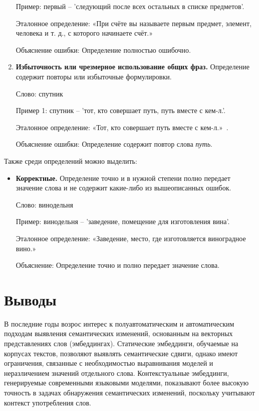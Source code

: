 \documentclass[LI,VKR]{HSEUniversity}
\begin{document}
\begin{enumerate}
   Пример: первый – ’следующий после всех остальных в списке предметов’.

   Эталонное определение: «При счёте вы называете первым предмет, элемент, человека и т. д., с которого начинаете счёт.»~\cite{TolkovyDmitriev}

   Объяснение ошибки: Определение полностью ошибочно.

%
%
%

\item \textbf{Избыточность или чрезмерное использование общих фраз.} Определение содержит повторы или избыточные формулировки.

%
%
%

   Слово: спутник

   Пример 1: спутник – ’тот, кто совершает путь, путь вместе с кем-л.’.

   Эталонное определение: «Тот, кто совершает путь вместе с кем-л.»~\cite{TolkovyKuznetsov}.

   Объяснение ошибки: Определение содержит повтор слова \textit{путь}.

\end{enumerate}

Также среди определений можно выделить:
\begin{itemize}
\item \textbf{Корректные.} Определение точно и в нужной степени полно передает значение слова и не содержит какие-либо из вышеописанных ошибок.

   Слово: винодельня

   Пример: винодельня – ’заведение, помещение для изготовления вина’.

   Эталонное определение: «Заведение, место, где изготовляется виноградное вино.»~\cite{ushakov1940}

   Объяснение: Определение точно и полно передает значение слова.
\end{itemize}

\section*{Выводы}

В последние годы возрос интерес к полуавтоматическим
и автоматическим подходам выявления семантических изменений,
основанным на векторных представлениях слов (эмбеддингах).
Статические эмбеддинги, обучаемые на корпусах текстов, позволяют выявлять семантические сдвиги,
однако имеют ограничения, связанные с необходимостью выравнивания моделей и неразличением значений
отдельного слова.
Контекстуальные эмбеддинги, генерируемые современными языковыми моделями,
показывают более высокую точность в задачах обнаружения семантических изменений,
поскольку учитывают контекст употребления слов.
\end{document}
